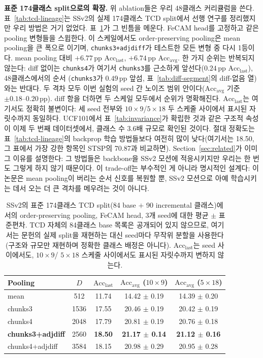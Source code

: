 \documentclass[11pt]{article}
\begin{document}
\textbf{표준 174클래스 split으로의 확장.} 위 ablation들은 우리 48클래스
커리큘럼을 쓴다. 표~\ref{tab:tcd-lineage}는 SSv2의 실제 174클래스 TCD
split에서 선행 연구를 정리했지만 우리 방법은 거기 없었다.
표~\ref{tab:ssv2-174}가 그 빈틈을 메운다. FeCAM head를 고정하고 같은
pooling 변형들을 스윕한다. 이 스케일에서도 order-preserving pooling은
mean pooling을 큰 폭으로 이기며, \texttt{chunks3+adjdiff}가 테스트한
모든 변형 중 다시 1등이다. mean pooling 대비
$+6.77$\,pp $\mathrm{Acc}_{\mathrm{last}}$, $+6.74$\,pp
$\mathrm{Acc}_{\mathrm{avg}}$. 한 가지 순위는 반복되지 않는다: diff
없이는 \texttt{chunks4}가 여기서 \texttt{chunks3}를 근소하게
앞선다($0.24$\,pp $\mathrm{Acc}_{\mathrm{last}}$), 48클래스에서의 순서
(\texttt{chunks3}가 $0.49$\,pp 앞섬, 표~\ref{tab:diff-segment}의
diff-없음 열)와는 반대다. 두 격차 모두 이번 실험의 seed 간 노이즈
범위 안이다($\mathrm{Acc}_{\mathrm{avg}}$ 기준 $\pm0.18$--$0.20$\,pp).
diff 항을 더하면 두 스케일 모두에서 순위가 명확해진다.
$\mathrm{Acc}_{\mathrm{last}}$는 여기서도 정확히 불변이다: 세 seed
전부와 $10{\times}9$/$5{\times}18$ 두 스케줄 사이에서 표시된 자릿수까지
동일하다. UCF101에서 표~\ref{tab:invariance}가 확립한 것과 같은 구조적
속성이 이제 두 번째 데이터셋에서, 클래스 수 $3.6$배 규모로 확인된
것이다. 절대 정확도는 표~\ref{tab:tcd-lineage}의 backprop 학습 방법들보다
여전히 많이 낮다(여기서는 18.50, 그 표에서 가장 강한 항목인 STSP의
70.87과 비교하면). Section~\ref{sec:related}가 이미 그 이유를 설명한다:
그 방법들은 backbone을 SSv2 모션에 적응시키지만 우리는 한 번도 그렇게
하지 않기 때문이다. 이 trade-off는 부수적인 게 아니라 명시적인 설계다:
이 논문은 mean pooling이 버리는 순서 신호를 복원할 뿐, SSv2 모션으로
아예 학습시키는 데서 오는 더 큰 격차를 메우려는 것이 아니다.

\begin{table}[h]
\centering
\caption{SSv2의 표준 174클래스 TCD split(84 base $+$ 90 incremental
클래스)에서의 order-preserving pooling, FeCAM head, 3개 seed에 대한
평균 $\pm$ 표준편차. TCD 자체의 84클래스 base 목록은 공개되어 있지
않으므로, 여기서는 문헌의 실제 split을 재현하는 대신 seed마다 무작위
분할을 사용한다(구조와 규모만 재현하며 정확한 클래스 배정은 아니다).
$\mathrm{Acc}_{\mathrm{last}}$는 seed 사이에서도, $10{\times}9$/
$5{\times}18$ 스케줄 사이에서도 표시된 자릿수까지 변하지 않는다.}
\label{tab:ssv2-174}
\small
\begin{tabular}{@{}lcccc@{}}
\toprule
Pooling & $D$ & $\mathrm{Acc}_{\mathrm{last}}$ & $\mathrm{Acc}_{\mathrm{avg}}$ ($10{\times}9$) & $\mathrm{Acc}_{\mathrm{avg}}$ ($5{\times}18$) \\
\midrule
mean & 512 & 11.74 & 14.42 $\pm$ 0.19 & 14.39 $\pm$ 0.20 \\
chunks3 & 1536 & 17.55 & 20.46 $\pm$ 0.19 & 20.42 $\pm$ 0.19 \\
chunks4 & 2048 & 17.79 & 20.81 $\pm$ 0.19 & 20.76 $\pm$ 0.18 \\
\textbf{chunks3+adjdiff} & 2560 & \textbf{18.50} & \textbf{21.17 $\pm$ 0.14} & \textbf{21.12 $\pm$ 0.16} \\
chunks4+adjdiff & 3584 & 18.15 & 20.98 $\pm$ 0.29 & 20.95 $\pm$ 0.28 \\
\bottomrule
\end{tabular}
\end{table}
\end{document}

